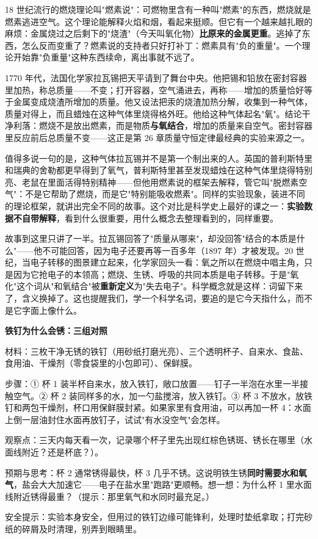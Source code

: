 \begin{zhengju}
18 世纪流行的燃烧理论叫"燃素说"：可燃物里含有一种叫"燃素"的东西，燃烧就是燃素逃进空气。这个理论能解释火焰和烟，看起来挺顺。但它有一个越来越扎眼的麻烦：金属烧过之后剩下的"烧渣"（今天叫氧化物）\textbf{比原来的金属更重}。逃掉了东西，怎么反而变重了？燃素说的支持者只好打补丁：燃素具有"负的重量"。一个理论开始靠"负重量"这种东西续命，离出事就不远了。

1770 年代，法国化学家拉瓦锡把天平请到了舞台中央。他把锡和铅放在密封容器里加热，称总质量——不变；打开容器，空气涌进去，再称——增加的质量恰好等于金属变成烧渣所增加的质量。他又设法把汞的烧渣加热分解，收集到一种气体，质量对得上，而且蜡烛在这种气体里烧得格外旺。他给这种气体起名"氧"。结论干净利落：燃烧不是放出燃素，而是物质\textbf{与氧结合}，增加的质量来自空气。密封容器里反应前后总质量不变——这正是第 26 章质量守恒定律最经典的实验来源之一。

值得多说一句的是，这种气体拉瓦锡并不是第一个制出来的人。英国的普利斯特里和瑞典的舍勒都更早得到了氧气，普利斯特里甚至发现蜡烛在这种气体里烧得特别亮、老鼠在里面活得特别精神——但他用燃素说的框架去解释，管它叫"脱燃素空气"：不是它帮助了燃烧，而是它"特别能吸收燃素"。同样的实验现象，装进不同的理论框架，就讲出完全不同的故事。这个对比是科学史上最好的课之一：\textbf{实验数据不自带解释}，看到什么很重要，用什么概念去整理看到的，同样重要。

故事到这里只讲了一半。拉瓦锡回答了"质量从哪来"，却没回答"结合的本质是什么"——他不可能回答，因为电子还要再等一百多年（1897 年）才被发现。20 世纪，当电子转移的图景建立起来，化学家回头一看：氧之所以在燃烧中唱主角，只是因为它抢电子的本领高；燃烧、生锈、呼吸的共同本质是电子转移。于是"氧化"这个词从"和氧结合"被\textbf{重新定义}为"失去电子"。科学概念就是这样：词留下来了，含义换掉了。这也提醒我们，学一个科学名词，要追的是它今天指什么，而不是它字面上像什么。
\end{zhengju}

\begin{shiyan}
\textbf{铁钉为什么会锈：三组对照}

材料：三枚干净无锈的铁钉（用砂纸打磨光亮）、三个透明杯子、自来水、食盐、食用油、干燥剂（零食袋里的小包即可）、保鲜膜。

步骤：① 杯 1 装半杯自来水，放入铁钉，敞口放置——钉子一半泡在水里一半接触空气。② 杯 2 装同样多的水，加一勺盐搅溶，放入铁钉。③ 杯 3 不放水，放铁钉和两包干燥剂，杯口用保鲜膜封紧。如果家里有食用油，可以再加一杯 4：水面上倒一层油封住水面再放钉子，试试"有水没空气"会怎样。

观察点：三天内每天看一次，记录哪个杯子里先出现红棕色锈斑、锈长在哪里（水面线附近？还是杯底？）。

预期与思考：杯 2 通常锈得最快，杯 3 几乎不锈。这说明铁生锈\textbf{同时需要水和氧气}，盐会大大加速它——电子在盐水里"跑路"更顺畅。想一想：为什么杯 1 里水面线附近锈得最重？（提示：那里氧气和水同时最充足。）

安全提示：实验本身安全，但用过的铁钉边缘可能锋利，处理时垫纸拿取；打完砂纸的碎屑及时清理，别弄到眼睛里。
\end{shiyan}

